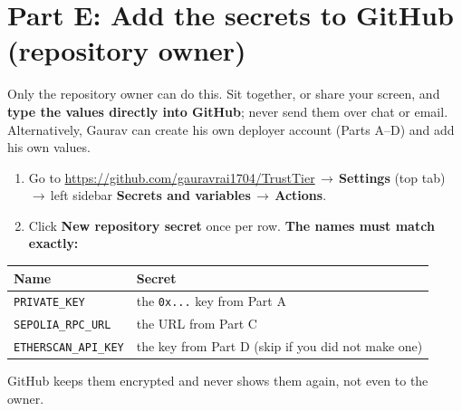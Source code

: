 \documentclass[11pt,a4paper]{article}
\newcommand{\ui}[1]{\textsf{\textbf{#1}}}
\newcommand{\code}[1]{\texttt{#1}}
\newcommand{\arr}{\,$\rightarrow$\,}
\begin{document}
\section{Part E: Add the secrets to GitHub (repository owner)}
\begin{tipbox}
Only the repository owner can do this. Sit together, or share your screen, and \textbf{type the values directly into GitHub}; never send them over chat or email. Alternatively, Gaurav can create his own deployer account (Parts A--D) and add his own values.
\end{tipbox}
\begin{enumerate}
  \item Go to \url{https://github.com/gauravrai1704/TrustTier}\arr\ui{Settings} (top tab)\arr left sidebar \ui{Secrets and variables}\arr\ui{Actions}.
  \item Click \ui{New repository secret} once per row. \textbf{The names must match exactly:}
\end{enumerate}
\begin{center}
\begin{tabularx}{0.9\textwidth}{@{}lX@{}}
\toprule
\textbf{Name} & \textbf{Secret} \\
\midrule
\code{PRIVATE\_KEY} & the \code{0x...} key from Part A \\
\code{SEPOLIA\_RPC\_URL} & the URL from Part C \\
\code{ETHERSCAN\_API\_KEY} & the key from Part D (skip if you did not make one) \\
\bottomrule
\end{tabularx}
\end{center}
GitHub keeps them encrypted and never shows them again, not even to the owner.
\end{document}
